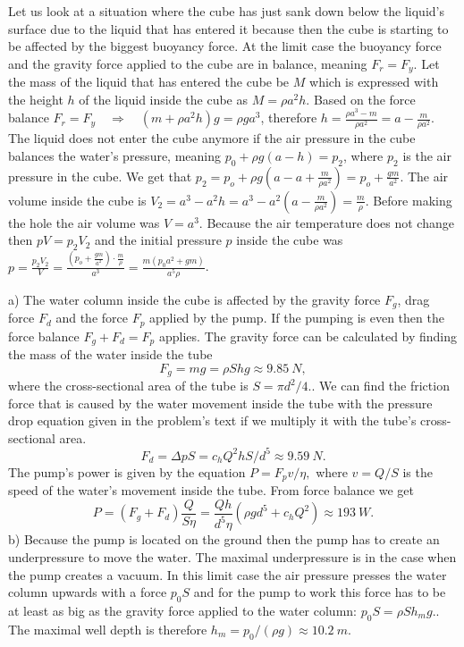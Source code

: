 \documentclass[11pt]{article}
\begin{document}

\solueng
Let us look at a situation where the cube has just sank down below the liquid’s surface due to the liquid that has entered it because then the cube is starting to be affected by the biggest buoyancy force. At the limit case the buoyancy force and the gravity force applied to the cube are in balance, meaning $F_r = F_y$. Let the mass of the liquid that has entered the cube be $M$ which is expressed with the height $h$ of the liquid inside the cube as $M = \rho a^2h$. Based on the force balance $F_r = F_y \quad\Rightarrow\quad (m + \rho a^2h)g=\rho ga^3$, therefore $h = \frac{\rho a^3 - m}{\rho a^2} = a - \frac{m}{\rho a^2}$. The liquid does not enter the cube anymore if the air pressure in the cube balances the water’s pressure, meaning $p_0 + \rho g(a-h) = p_2$, where $p_2$ is the air pressure in the cube. We get that $p_2 = p_o + \rho g\left(a - a + \frac{m}{\rho a^2}\right) = p_o +  \frac{gm}{a^2}$. The air volume inside the cube is $V_2 = a^3 - a^2h = a^3 - a^2\left(a - \frac{m}{\rho a^2}\right) = \frac{m}{\rho}$. Before making the hole the air volume was $V=a^3$. Because the air temperature does not change then $pV = p_2V_2$ and the initial pressure $p$ inside the cube was $p = \frac{p_2V_2}{V} = \frac{ \left( p_o +  \frac{gm}{a^2} \right) \cdot \frac{m}{\rho}}{a^3} = \frac{m(p_0a^2 + gm)}{a^5\rho}$.
\probend
\bigskip


\solueng
a) The water column inside the cube is affected by the gravity force $F_{g}$, drag force $F_{d}$ and the force $F_{p}$ applied by the pump. If the pumping is even then the force balance $F_{g}+F_{d}=F_{p}$ applies. The gravity force can be calculated by finding the mass of the water inside the tube
\[
F_{g}=mg=\rho Shg\approx\SI{9.85}{N},
\]
where the cross-sectional area of the tube is $S=\pi d^{2}/4.$. We can find the friction force that is caused by the water movement inside the tube with the pressure drop equation given in the problem’s text if we multiply it with the tube’s cross-sectional area. 
\[
F_{d}=\Delta pS=c_{h}Q^{2}hS/d^{5}\approx\SI{9.59}{N}.
\]
The pump’s power is given by the equation $P=F_{p}v/\eta,$ where $v=Q/S$ is the speed of the water’s movement inside the tube. From force balance we get
\[
P=\left(F_{g}+F_{d}\right)\frac{Q}{S\eta}=\frac{Qh}{d^{5}\eta}\left(\rho gd^{5}+c_{h}Q^{2}\right)\approx\SI{193}{W}.
\]
b) Because the pump is located on the ground then the pump has to create an underpressure to move the water. The maximal underpressure is in the case when the pump creates a vacuum. In this limit case the air pressure presses the water column upwards with a force $p_{0}S$ and for the pump to work this force has to be at least as big as the gravity force applied to the water column: $p_{0}S=\rho Sh_{m}g.$. The maximal well depth is therefore $h_{m}=p_{0}/\left(\rho g\right)\approx\SI{10.2}{m}$.
\probend
\bigskip
\end{document}
